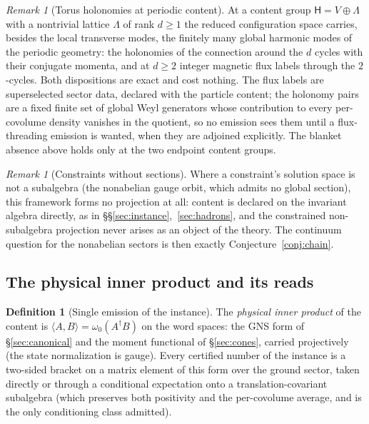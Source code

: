 \documentclass[11pt]{article}
\theoremstyle{definition}
\newtheorem{definition}[theorem]{Definition}
\theoremstyle{remark}
\newtheorem{remark}[theorem]{Remark}
\newcommand{\w}{\omega_0}
\begin{document}
\begin{remark}[Torus holonomies at periodic content]\label{rem:holonomy}
At a content group $\mathsf H = V \oplus \Lambda$ with a nontrivial lattice
$\Lambda$ of rank $d \ge 1$ the reduced configuration space carries, besides
the local transverse modes, the finitely many global harmonic modes of the
periodic geometry: the holonomies of the connection around the $d$ cycles
with their conjugate momenta, and at $d \ge 2$ integer magnetic flux labels
through the $2$-cycles.  Both dispositions are exact and cost nothing.  The
flux labels are superselected sector data, declared with the particle
content; the holonomy pairs are a fixed finite set of global Weyl generators
whose contribution to every per-covolume density vanishes in the quotient,
so no emission sees them until a flux-threading emission is wanted, when they
are adjoined explicitly.  The blanket absence above holds only at the two
endpoint content groups.
\end{remark}

\begin{remark}[Constraints without sections]\label{rem:sections}
Where a constraint's solution space is not a subalgebra (the nonabelian
gauge orbit, which admits no global section), this framework forms no
projection at all: content is declared on the invariant algebra
directly, as in \S\S\ref{sec:instance},~\ref{sec:hadrons}, and the
constrained non-subalgebra projection never arises as an object of the
theory.  The continuum question for the nonabelian sectors is then
exactly Conjecture~\ref{conj:chain}.
\end{remark}

\subsection{The physical inner product and its reads}
\begin{definition}[Single emission of the instance]\label{def:pip}
The \emph{physical inner product} of the content is $\langle A, B
\rangle = \w(A^\dagger B)$ on the word spaces: the GNS form of
\S\ref{sec:canonical} and the moment functional of \S\ref{sec:cones},
carried projectively (the state normalization is gauge).  Every
certified number of the instance is a two-sided bracket on a matrix
element of this form over the ground sector, taken directly or through a
conditional expectation onto a translation-covariant subalgebra (which
preserves both positivity and the per-covolume average, and is the only
conditioning class admitted).
\end{definition}
\end{document}
